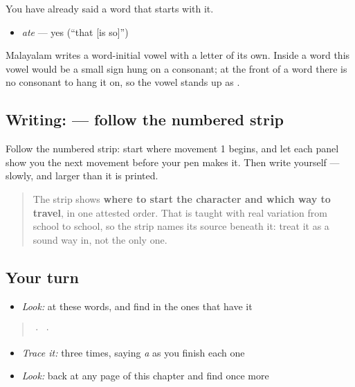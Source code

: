 You have already said a word that starts with it.

\begin{itemize}
\raggedright
  \item \textbf{} \emph{ate} — yes (\textquotedblleft{}that {[}is so{]}\textquotedblright{})
\end{itemize}

Malayalam writes a word-initial vowel with a letter of its own. Inside a word this vowel would be a small sign hung on a consonant; at the front of a word there is no consonant to hang it on, so the vowel stands up as \textbf{}.

\subsection*{Writing:  — follow the numbered strip}

Follow the numbered strip: start where movement 1 begins, and let each panel show you the next movement before your pen makes it. Then write  yourself — slowly, and larger than it is printed.

\begin{quote}
The strip shows \textbf{where to start the character and which way to travel}, in one attested order. That is taught with real variation from school to school, so the strip names its source beneath it: treat it as a sound way in, not the only one.
\end{quote}

\subsection*{Your turn}
\begin{itemize}
\raggedright
  \item \emph{Look:} at these words, and find  in the ones that have it
\end{itemize}

\begin{quote}
  ·    ·  
\end{quote}

\begin{itemize}
\raggedright
  \item \emph{Trace it:}  three times, saying \emph{a} as you finish each one
  \item \emph{Look:} back at any page of this chapter and find  once more
\end{itemize}

